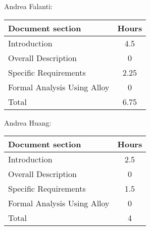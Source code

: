 Andrea Falanti:

\begin{tabular}{|l|c|}
    \hline
    Document section & Hours \\
    \hline
     Introduction & 4.5\\
     Overall Description & 0\\
     Specific Requirements & 2.25\\
     Formal Analysis Using Alloy & 0\\
     \hline
     Total & 6.75\\
     \hline
\end{tabular}
\vskip 0.3in

Andrea Huang:

\begin{tabular}{|l|c|}
    \hline
    Document section & Hours \\
    \hline
     Introduction &  2.5\\
     Overall Description & 0\\
     Specific Requirements & 1.5\\
     Formal Analysis Using Alloy & 0\\
     \hline
     Total & 4\\
     \hline
\end{tabular}